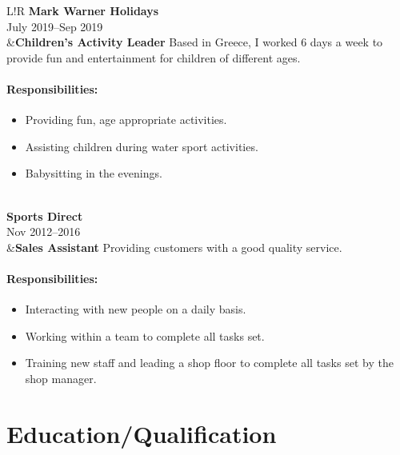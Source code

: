 \documentclass[10pt]{article}
\newcommand\VRule{\color{lightgray}\vrule width 0.5pt}
\begin{document}
\begin{longtable}{L!{\VRule}R}
{\bf Mark Warner Holidays}\\
July 2019--Sep 2019\\
&{\bf Children's Activity Leader}\newline
Based in Greece, I worked 6 days a week to provide fun and entertainment for children of different ages.

\vspace{-3mm}
\paragraph{Responsibilities:}
\begin{itemize}[noitemsep,topsep=0pt]
    \item Providing fun, age appropriate activities.
    \item Assisting children during water sport activities.
    \item Babysitting in the evenings.
\end{itemize}
\\

{\bf Sports Direct}\\
Nov 2012--2016\\
&{\bf Sales Assistant}\newline
Providing customers with a good quality service.

\vspace{-3mm}
\paragraph{Responsibilities:}
\begin{itemize}[noitemsep,topsep=0pt]
    \item Interacting with new people on a daily basis.
    \item Working within a team to complete all tasks set.
    \item Training new staff and leading a shop floor to complete all tasks set by the shop manager.
\end{itemize}
\end{longtable}

\clearpage

\section*{Education/Qualification}
\end{document}
